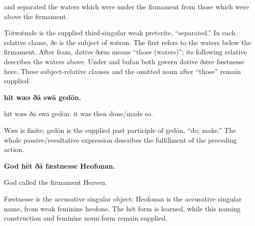 and separated the waters which were under the firmament from those which were above the firmament.

Tōtwǣmde is the supplied third-singular weak preterite, “separated.” In each relative clause, ðe is the subject of wǣron. The first refers to the waters below the firmament. After fram, dative ðǣm means “those (waters)”; its following relative describes the waters above. Under and bufan both govern dative ðǣre fæstnesse here. These subject-relative clauses and the omitted noun after “those” remain supplied.

\textbf{hit wæs ðā swā gedōn.}

hit wæs ðā swā gedōn: it was then done/\allowbreak{}made so.

Wæs is finite; gedōn is the supplied past participle of gedōn, “do; make.” The whole passive/\allowbreak{}resultative expression describes the fulfillment of the preceding action.

\textbf{God hēt ðā fæstnesse Heofonan.}

God called the firmament Heaven.

Fæstnesse is the accusative singular object; Heofonan is the accusative singular name, from weak feminine heofone. The hēt form is learned, while this naming construction and feminine noun form remain supplied.


